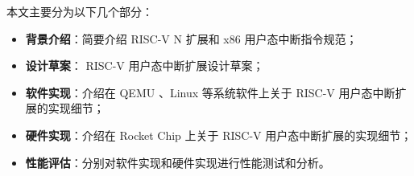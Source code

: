 本文主要分为以下几个部分：

\begin{itemize}
    \item \textbf{背景介绍}：简要介绍 RISC-V N 扩展和 x86 用户态中断指令规范；
    \item \textbf{设计草案}： RISC-V 用户态中断扩展设计草案；
    \item \textbf{软件实现}：介绍在 QEMU 、Linux 等系统软件上关于 RISC-V 用户态中断扩展的实现细节；
    \item \textbf{硬件实现}：介绍在 Rocket Chip 上关于 RISC-V 用户态中断扩展的实现细节；
    \item \textbf{性能评估}：分别对软件实现和硬件实现进行性能测试和分析。
\end{itemize}